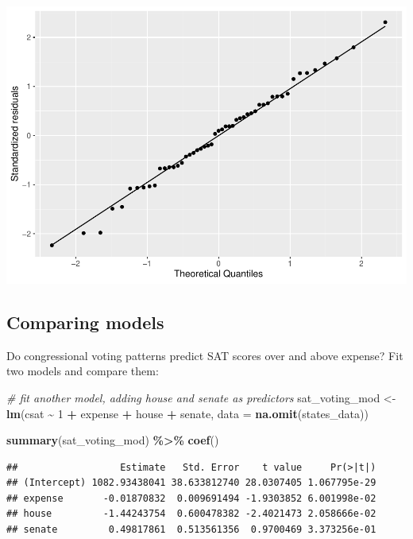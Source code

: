 \documentclass[
]{book}
\newenvironment{Shaded}{\begin{snugshade}}{\end{snugshade}}
\newcommand{\CommentTok}[1]{\textcolor[rgb]{0.56,0.35,0.01}{\textit{#1}}}
\newcommand{\DataTypeTok}[1]{\textcolor[rgb]{0.13,0.29,0.53}{#1}}
\newcommand{\DecValTok}[1]{\textcolor[rgb]{0.00,0.00,0.81}{#1}}
\newcommand{\KeywordTok}[1]{\textcolor[rgb]{0.13,0.29,0.53}{\textbf{#1}}}
\newcommand{\NormalTok}[1]{#1}
\newcommand{\OperatorTok}[1]{\textcolor[rgb]{0.81,0.36,0.00}{\textbf{#1}}}
\newcommand{\StringTok}[1]{\textcolor[rgb]{0.31,0.60,0.02}{#1}}
\begin{document}
\includegraphics{R/Rmodels/figures/unnamed-chunk-91-2.pdf}

\hypertarget{comparing-models}{%
\subsection{Comparing models}\label{comparing-models}}

Do congressional voting patterns predict SAT scores over and above expense? Fit two models and compare them:

\begin{Shaded}
\begin{Highlighting}[]
  \CommentTok{\# fit another model, adding house and senate as predictors}
\NormalTok{  sat\_voting\_mod \textless{}{-}}\StringTok{ }\KeywordTok{lm}\NormalTok{(csat }\OperatorTok{\textasciitilde{}}\StringTok{ }\DecValTok{1} \OperatorTok{+}\StringTok{ }\NormalTok{expense }\OperatorTok{+}\StringTok{ }\NormalTok{house }\OperatorTok{+}\StringTok{ }\NormalTok{senate,}
                        \DataTypeTok{data =} \KeywordTok{na.omit}\NormalTok{(states\_data))}

  \KeywordTok{summary}\NormalTok{(sat\_voting\_mod) }\OperatorTok{\%\textgreater{}\%}\StringTok{ }\KeywordTok{coef}\NormalTok{()}
\end{Highlighting}
\end{Shaded}

\begin{verbatim}
##                  Estimate   Std. Error    t value     Pr(>|t|)
## (Intercept) 1082.93438041 38.633812740 28.0307405 1.067795e-29
## expense       -0.01870832  0.009691494 -1.9303852 6.001998e-02
## house         -1.44243754  0.600478382 -2.4021473 2.058666e-02
## senate         0.49817861  0.513561356  0.9700469 3.373256e-01
\end{verbatim}
\end{document}
